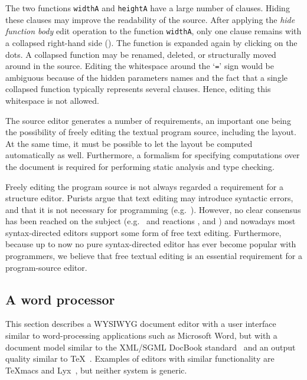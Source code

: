 \documentclass{speauth}
\begin{document}
The two functions \verb|widthA| and \verb|heightA| have a large number of clauses. Hiding these clauses may improve the readability of the source. After applying the {\em hide function body} edit operation to the function \verb|widthA|,  only one clause remains with a collapsed right-hand side (\hspace{0.5pt}{\tt \framebox{\rule{0cm}{1.5ex}\dots}}\hspace{0.5pt}). The function is expanded again by clicking on the dots. A collapsed function may be renamed, deleted, or structurally moved around in the source. Editing the whitespace around the `\verb|=|' sign would be ambiguous because of the hidden parameters names and the fact that a single collapsed function typically represents several clauses. Hence, editing this whitespace is not allowed.


The source editor generates a number of requirements, an important one being the possibility of freely editing the textual program source, including the layout. At the same time, it must be possible to let the layout be computed automatically as well. Furthermore, a formalism for specifying computations over the document is required for performing static analysis and type checking.

Freely editing the program source is not always regarded a requirement for a structure editor. Purists argue that text editing may introduce syntactic errors, and that it is not necessary for programming (e.g.~\cite{teitelbaum81progSynth,magnusson90orm}). However, no clear consensus has been reached on the subject (e.g.~\cite{abandonText82waters} and reactions \cite{shani83notAbandon,responseToWaters83notkin}, and \cite{vanter94practical}) and nowadays most syntax-directed editors support some form of free text editing. Furthermore, because up to now no pure syntax-directed editor has ever become popular with programmers, we believe that free textual editing is an essential requirement for a program-source editor.


\subsection{A word processor} 
\label{sect:wordprocessor} 

This section describes a WYSIWYG document editor with a user interface similar to word-processing applications such as Microsoft Word, but with a document model similar to the XML/SGML DocBook standard~\cite{walsh02docbook} and an output quality similar to \TeX~\cite{knuth84tex}. Examples of editors with similar functionality are TeXmacs\cite{texmacs} and Lyx~\cite{lyx}, but neither system is generic.
\vspace*{1.4ex}
\end{document}
